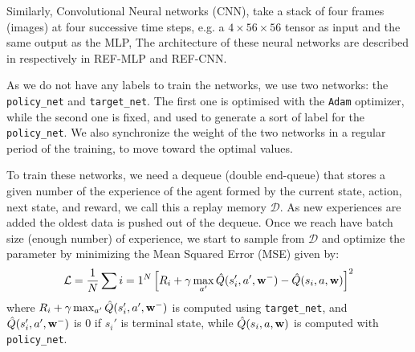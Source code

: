 Similarly, Convolutional Neural networks (CNN), take a stack of four frames (images) at four successive time steps, e.g. a $4\times56\times56$ tensor as input and the same output as the MLP, The architecture of these neural networks are described in respectively in REF-MLP and REF-CNN.


As we do not have any labels to train the networks, we use two networks: the \texttt{policy\_net} and \texttt{target\_net}. The first one is optimised with the \texttt{Adam} optimizer, while the second one is fixed, and used to generate a sort of label for the \texttt{policy\_net}. We also synchronize the weight of the two networks in a regular period of the training, to move toward the optimal values.


To train these networks, we need a dequeue (double end-queue) that stores a given number of the experience of the agent formed by the current state, action, next state, and reward, we call this a replay memory $\mathcal{D}$. As new experiences are added the oldest data is pushed out of the dequeue.
Once we reach have batch size (enough number) of experience, we start to sample from $\mathcal{D}$ and optimize the  parameter by minimizing the Mean Squared Error (MSE) given by:
\begin{equation}
	\mathcal{L} = \frac{1}{N}\sum{i=1}^{N}\left[R_i + \gamma\max_{a'}\hat{Q}(s_i', a', \mathbf{w}^{-}) - \hat{Q}(s_i, a, \mathbf{w})\right]^2
\end{equation}
where $R_i + \gamma\max_{a'}\hat{Q}(s_i', a', \mathbf{w}^{-})$ is computed using \texttt{target\_net}, and $\hat{Q}(s_i', a', \mathbf{w}^{-})$ is $0$ if $s_i'$ is terminal state, while $\hat{Q}(s_i, a, \mathbf{w})$ is computed with \texttt{policy\_net}.


